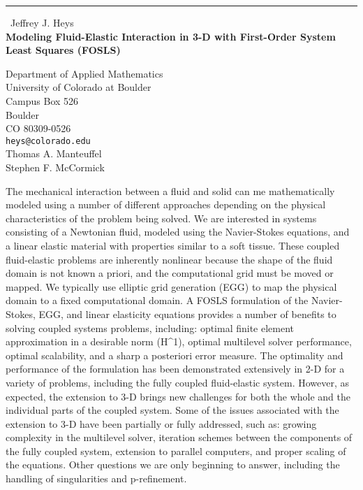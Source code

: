\documentclass{report}
\begin{document}
\begin{center}
\rule{6in}{1pt} \
{\large Jeffrey J. Heys \\
{\bf Modeling Fluid-Elastic Interaction in 3-D with First-Order System Least Squares (FOSLS)}}

Department of Applied Mathematics \\ University of Colorado at Boulder \\ Campus Box 526 \\ Boulder \\ CO  80309-0526
\\
{\tt heys@colorado.edu}\\
Thomas A. Manteuffel\\
Stephen F. McCormick\end{center}

The mechanical interaction between a fluid and solid can me
mathematically modeled using a number of different approaches depending
on the physical characteristics of the problem being solved. We are
interested in systems consisting of a Newtonian fluid, modeled using the
Navier-Stokes equations, and a linear elastic material with properties
similar to a soft tissue. These coupled fluid-elastic problems are
inherently nonlinear because the shape of the fluid domain is not known a
priori, and the computational grid must be moved or mapped. We typically
use elliptic grid generation (EGG) to map the physical domain to a fixed
computational domain. A FOSLS formulation of the Navier-Stokes, EGG, and
linear elasticity equations provides a number of benefits to solving
coupled systems problems, including: optimal finite element approximation
in a desirable norm (H^1), optimal multilevel solver performance, optimal
scalability, and a sharp a posteriori error measure. The optimality and
performance of the formulation has been demonstrated extensively in 2-D
for a variety of problems, including the fully coupled fluid-elastic
system. However, as expected, the extension to 3-D brings new challenges
for both the whole and the individual parts of the coupled system. Some
of the issues associated with the extension to 3-D have been partially or
fully addressed, such as: growing complexity in the multilevel solver,
iteration schemes between the components of the fully coupled system,
extension to parallel computers, and proper scaling of the equations.
Other questions we are only beginning to answer, including the handling
of singularities and p-refinement.
\end{document}
